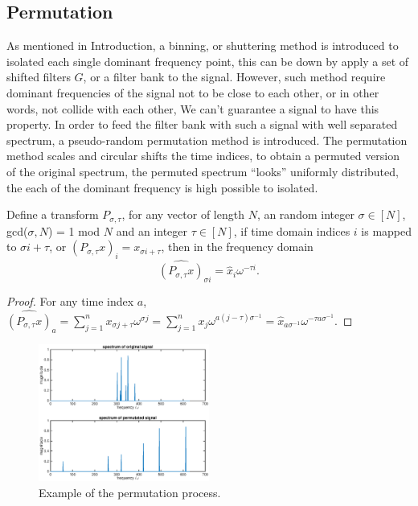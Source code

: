 \documentclass[journal,transmag]{IEEEtran}
\begin{document}
\subsection{Permutation}
As mentioned in Introduction, a binning, or shuttering method is introduced to isolated each single dominant frequency point, this can be down by apply a set of shifted filters $G$, or a filter bank  to the signal. However, such method require dominant frequencies of the signal not to be close to each other, or in other words, not  collide with each other, We can’t guarantee a signal to have this property. In order to feed the filter bank with such a signal with well separated spectrum, a pseudo-random permutation method is introduced\cite{hassanieh2012simple}. The permutation method scales and circular shifts the time indices, to obtain a permuted version of the original spectrum, the permuted spectrum “looks” uniformly distributed, the each of the dominant frequency is high possible to isolated. 

\begin{defn}
	Define a transform $P_{\sigma,\tau}$, for any vector of length $N$, an random integer $\sigma\in[N]$, gcd($\sigma,N$) = 1 mod $N$  and an integer $\tau\in[N]$, if time domain indices $i$ is mapped to $\sigma i+\tau$, or $(P_{\sigma,\tau}x)_i = x_{\sigma i+\tau}$, then in the frequency domain
	\begin{equation}
		\widehat{(P_{\sigma,\tau}x)}_{\sigma i}=\hat{x}_i\omega^{-\tau i}.
		\label{eq1}
	\end{equation} 
\end{defn}

\begin{proof}
	For any time index $a$, $\widehat{(P_{\sigma,\tau}x)}_a=\sum_{j=1}^{n}x_{\sigma j+\tau}\omega^{\sigma j}=\sum_{j=1}^{n}x_j\omega^{a(j-\tau)\sigma^{-1}}=\hat{x}_{a\sigma^{-1}}\omega^{-\tau a\sigma^{-1}}$.
\end{proof}

\begin{figure}[htbp]
	\includegraphics[width=0.5\textwidth]{permutation}
	\caption{Example of the permutation process.}
	\label{permutation}
\end{figure}
\end{document}
